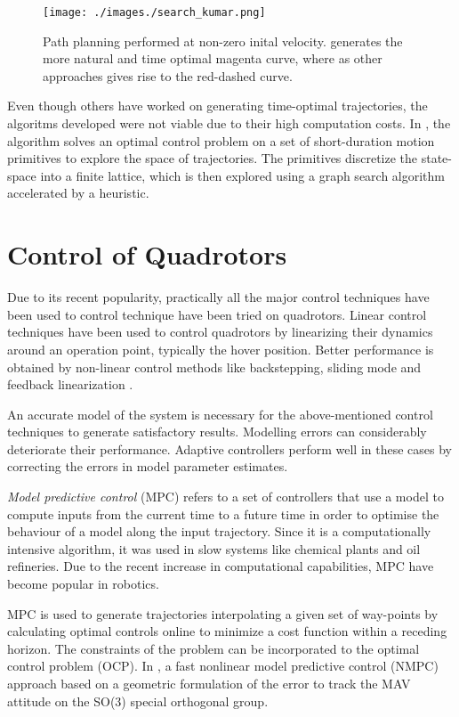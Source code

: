 \begin{figure}[h!]
\centering
\texttt{[image: ./images./search\_kumar.png]}
\caption{Path planning performed at non-zero inital velocity. \cite{kumar2017search} generates the more natural and time optimal magenta curve, where as other approaches gives rise to the red-dashed curve.}
\label{fig:search_kumar}
\end{figure}

Even though others have worked on generating time-optimal trajectories, the algoritms developed were not viable due to their high computation costs. In \cite{kumar2017search}, the algorithm solves an optimal control problem on a set of short-duration motion primitives to explore the space of trajectories. The primitives discretize the state-space into a finite lattice, which is then explored using a graph search algorithm accelerated by a heuristic. 

\section{Control of Quadrotors}
\label{sec:control_quadrotors}
Due to its recent popularity, practically all the major control techniques have been used to control technique have been tried on quadrotors. Linear control techniques \cite{seigwart2004pid} have been used to control quadrotors by linearizing their dynamics around an operation point, typically the hover position. Better performance is obtained by non-linear control methods like backstepping, sliding mode \cite{seigwart2005backstepping} and feedback linearization \cite{lewis2009dynamic}.

An accurate model of the system is necessary for the above-mentioned control techniques to generate satisfactory results. Modelling errors can considerably deteriorate their performance. Adaptive controllers \cite{kumar2011design} perform well in these cases by correcting the errors in model parameter estimates.

\textit{Model predictive control} (MPC) refers to a set of controllers that use a model to compute inputs from the current time to a future time in order to optimise the behaviour of a model along the input trajectory. Since it is a computationally intensive algorithm, it was used in slow systems like chemical plants and oil refineries. Due to the recent increase in computational capabilities, MPC have become popular in robotics. 

MPC is used to generate trajectories interpolating a given set of way-points \cite{singh2001trajectory} by calculating optimal controls online to minimize a cost function within a receding horizon. The constraints of the problem can be incorporated to the optimal control problem (OCP). In \cite{kamel2015fast}, a fast nonlinear model predictive control (NMPC) approach based on a geometric formulation of the error to track the MAV attitude on the SO(3) special orthogonal group. 

